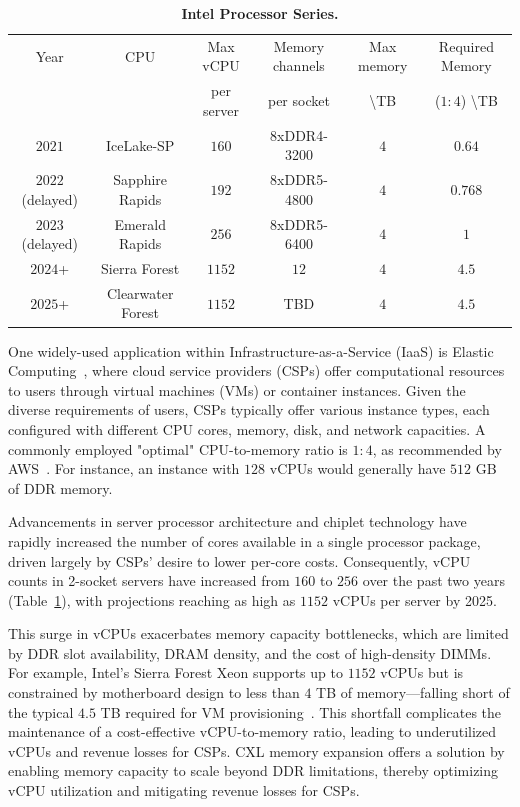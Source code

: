 \begin{table}[!]
  \centering
  \small
  \begin{tabular}{c|c|c|c|c|c} 
        \hline
        Year & CPU & Max vCPU  & Memory channels & Max memory & Required Memory \\
        & & per server & per socket & \textbackslash TB & ($1:4$) \textbackslash TB\\\hline
        $2021$ & IceLake-SP\cite{icelakecores} & $160$ & 8xDDR4-3200 & $4$ & $0.64$ \\\hline
        $2022$ (delayed) & Sapphire Rapids\cite{sprcores} & $192$ & 8xDDR5-4800 & 	$4$ & $0.768$ \\\hline
        $2023$ (delayed) & Emerald Rapids\cite{emeraldrapidscores} & $256$ & 8xDDR5-6400 & $4$ & $1$ \\\hline
        $2024$+  & Sierra Forest\cite{sierraforestcores} & $1152$ & $12$ & $4$ & $4.5$ \\\hline
        $2025$+ & Clearwater Forest\cite{clearwatercores} & $1152$ & TBD & $4$ & $4.5$ \\\hline
  \end{tabular}
  \caption[Intel Processor Series]{\textbf{Intel Processor Series.} }
  \label{tab:amd}
\end{table}

One widely-used application within Infrastructure-as-a-Service (IaaS) is Elastic Computing~\cite{elasticcomputing}, where cloud service providers (CSPs) offer computational resources to users through virtual machines (VMs) or container instances. Given the diverse requirements of users, CSPs typically offer various instance types, each configured with different CPU cores, memory, disk, and network capacities. A commonly employed "optimal" CPU-to-memory ratio is $1:4$, as recommended by AWS~\cite{awsm7a, awsm7i}. For instance, an instance with $128$ vCPUs would generally have $512$ GB of DDR memory.

Advancements in server processor architecture and chiplet technology have rapidly increased the number of cores available in a single processor package, driven largely by CSPs' desire to lower per-core costs. Consequently, vCPU counts in 2-socket servers have increased from $160$ to $256$ over the past two years (Table~\ref{tab:amd}), with projections reaching as high as $1152$ vCPUs per server by 2025.

This surge in vCPUs exacerbates memory capacity bottlenecks, which are limited by DDR slot availability, DRAM density, and the cost of high-density DIMMs. For example, Intel's Sierra Forest Xeon supports up to $1152$ vCPUs but is constrained by motherboard design to less than $4$ TB of memory—falling short of the typical $4.5$ TB required for VM provisioning~\cite{1dpc}. This shortfall complicates the maintenance of a cost-effective vCPU-to-memory ratio, leading to underutilized vCPUs and revenue losses for CSPs. CXL memory expansion offers a solution by enabling memory capacity to scale beyond DDR limitations, thereby optimizing vCPU utilization and mitigating revenue losses for CSPs.

